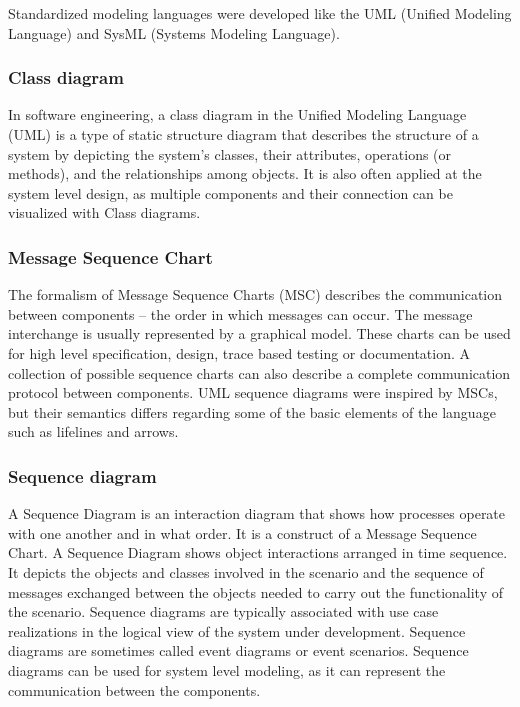 Standardized modeling languages were developed like the UML (Unified Modeling Language\citep{uml}) and SysML (Systems Modeling Language\citep{sysml1}\citep{sysml2}).


\subsubsection{Class diagram}

In software engineering, a class diagram in the Unified Modeling Language (UML) is a type of static structure diagram that describes the structure of a system by depicting the system's classes, their attributes, operations (or methods), and the relationships among objects. It is also often applied at the system level design, as multiple components and their connection can be visualized with Class diagrams.


\subsubsection{Message Sequence Chart}

The formalism of Message Sequence Charts (MSC) describes the communication between components -- the order in which messages can occur\citep{msc}\citep{msc2}. The message interchange is usually represented by a graphical model. These charts can be used for high level specification, design, trace based testing or documentation. A collection of possible sequence charts can also describe a complete communication protocol between components. UML sequence diagrams were inspired by MSCs, but their semantics differs regarding some of the basic elements of the language such as lifelines and arrows\citep{mscuml}.

\subsubsection{Sequence diagram}

A Sequence Diagram is an interaction diagram that shows how processes operate with one another and in what order. It is a construct of a Message Sequence Chart. A Sequence Diagram shows object interactions arranged in time sequence. It depicts the objects and classes involved in the scenario and the sequence of messages exchanged between the objects needed to carry out the functionality of the scenario. Sequence diagrams are typically associated with use case realizations in the logical view of the system under development. Sequence diagrams are sometimes called event diagrams or event scenarios. Sequence diagrams can be used for system level modeling, as it can represent the communication between the components. 


